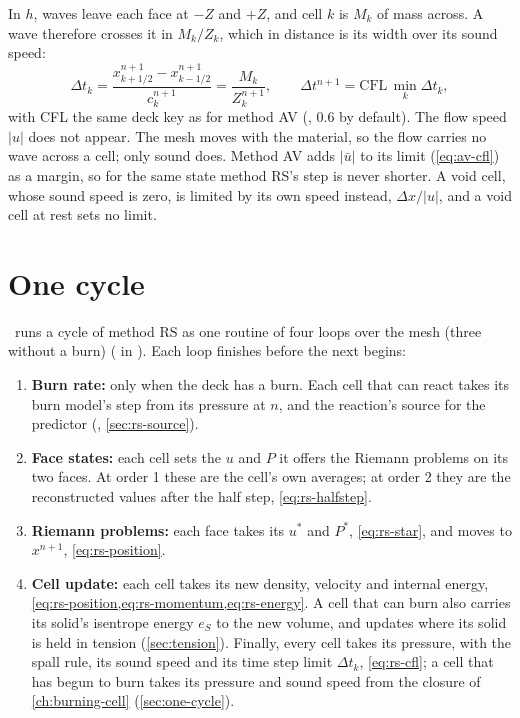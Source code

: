 In $h$, waves leave each face at $-Z$ and $+Z$, and cell $k$ is $M_k$ of
mass across. A wave therefore crosses it in $M_k/Z_k$, which in distance is
its width over its sound speed:
\begin{equation}
\Delta t_k = \frac{x^{n+1}_{k+1/2} - x^{n+1}_{k-1/2}}{c^{n+1}_k}
           = \frac{M_k}{Z^{n+1}_k},
\qquad
\Delta t^{n+1} = \mathrm{CFL}\,\min_k \Delta t_k ,
\label{eq:rs-cfl}
\end{equation}
with CFL the same deck key as for method AV (, 0.6 by default).
The flow speed $|u|$ does not appear. The mesh moves with the material, so
the flow carries no wave across a cell; only sound does. Method AV adds
$|\bar u|$ to its limit (\cref{eq:av-cfl}) as a margin, so for the same
state method RS's step is never shorter. A void cell, whose sound speed is
zero, is limited by its own speed instead, $\Delta x/|u|$, and a void cell at
rest sets no limit.

\section{One cycle}
\label{sec:rs-cycle}

\bw\ runs a cycle of method RS as one routine of four loops over the mesh (three without a burn)
( in ). Each loop finishes before the
next begins:

\begin{enumerate}
\item[0$'$.] \textbf{Burn rate:} only when the deck has a burn. Each cell
  that can react takes its burn model's step from its pressure at $n$, and
  the reaction's source for the predictor (,
  \cref{sec:rs-source}).
\item[0.] \textbf{Face states:} each cell sets the $u$ and $P$ it offers
  the Riemann problems on its two faces. At order 1 these are the cell's own
  averages; at order 2 they are the reconstructed values after the half
  step, \cref{eq:rs-halfstep}.
\item[1.] \textbf{Riemann problems:} each face takes its $u^*$ and $P^*$,
  \cref{eq:rs-star}, and moves to $x^{n+1}$, \cref{eq:rs-position}.
\item[2.] \textbf{Cell update:} each cell takes its new density, velocity
  and internal energy, \cref{eq:rs-position,eq:rs-momentum,eq:rs-energy}.
  A cell that can burn also carries its solid's isentrope energy $e_S$ to
  the new volume, and updates where its solid is held in tension
  (\cref{sec:tension}). Finally, every cell takes its pressure, with the
  spall rule, its sound speed and its time step limit $\Delta t_k$,
  \cref{eq:rs-cfl}; a cell that has begun to burn takes its pressure and
  sound speed from the closure of \cref{ch:burning-cell}
  (\cref{sec:one-cycle}).
\end{enumerate}

